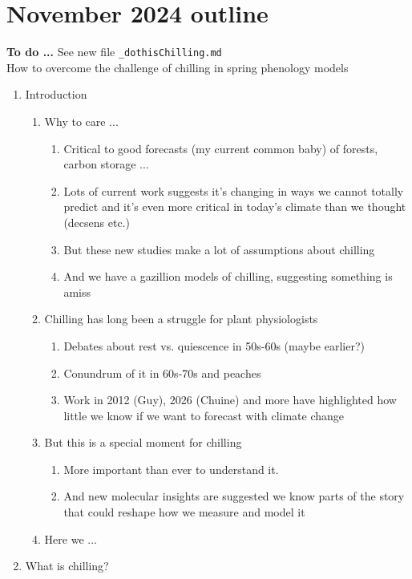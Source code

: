 \documentclass[11pt,letter]{article}
\begin{document}
\section{November 2024 outline} %

{\bf To do ... } See new file \verb|_dothisChilling.md|\\

{\sc How to overcome the challenge of chilling in spring phenology models} %
\begin{enumerate}
\item Introduction
\begin{enumerate}
\item Why to care ...
\begin{enumerate}
\item Critical to good forecasts (my current common baby) of forests, carbon storage ...
\item Lots of current work suggests it's changing in ways we cannot totally predict and it's even more critical in today's climate than we thought (decsens etc.)
\item But these new studies make a lot of assumptions about chilling 
\item And we have a gazillion models of chilling, suggesting something is amiss
\end{enumerate}
\item Chilling has long been a struggle for plant physiologists
\begin{enumerate}
\item Debates about rest vs. quiescence in 50s-60s (maybe earlier?)
\item Conundrum of it in 60s-70s and peaches
\item Work in 2012 (Guy), 2026 (Chuine) and more have highlighted how little we know if we want to forecast with climate change
\end{enumerate}
\item But this is a special moment for chilling
\begin{enumerate}
\item More important than ever to understand it.
\item And new molecular insights are suggested we know parts of the story that could reshape how we measure and model it
\end{enumerate}
\item Here we ...
\end{enumerate}
\item What is chilling?

\end{enumerate}
\end{document}
